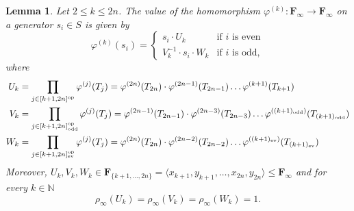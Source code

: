 \documentclass[12pt,reqno,a4paper]{article}
\newtheorem{lemma}[theorem]{Lemma}
\theoremstyle{definition}
\theoremstyle{remark}
\numberwithin{equation}{section}
\numberwithin{figure}{section}
\newcommand{\B}[1]{{\mathbf #1}}
\begin{document}
\begin{lemma}\label{L:fi(k)}
Let $2\leq k\leq 2n$. 
The value of the homomorphism $\varphi^{(k)}\colon \B F_\infty\to \B F_\infty$ on a generator $s_i\in S$ is given by
\begin{equation}
\varphi^{(k)}(s_i)=
\begin{cases}
s_i\cdot U_{k} & \text{if $i$ is even}\\
V_{k}^{-1} \cdot s_i\cdot W_{k} & \text{if $i$ is odd},
\end{cases}
\label{Eq:fi(k)}
\end{equation}
where
\begin{align*}
U_{k} 
&= 
\prod_{j \in [k+1,2n]^{\rm op}} \varphi^{(j)}(T_j) = 
\varphi^{(2n)}(T_{2n}) \cdot \varphi^{(2n-1)}(T_{2n-1}) \dots  \varphi^{(k+1)}(T_{k+1})
\\
V_{k}
&= 
\prod_{j \in [k+1,2n]_{\rm odd}^{\rm op}} \varphi^{(j)}(T_j) = 
\varphi^{(2n-1)}(T_{2n-1}) \cdot \varphi^{(2n-3)}(T_{2n-3}) \dots  \varphi^{((k+1)_{\rm odd})}(T_{(k+1)_{\rm odd}})
\\
W_{k} 
&= 
\prod_{j \in [k+1,2n]_{\rm ev}^{\rm op}} \varphi^{(j)}(T_j) = 
\varphi^{(2n)}(T_{2n}) \cdot \varphi^{(2n-2)}(T_{2n-2}) \dots  \varphi^{((k+1)_{\rm ev})}(T_{(k+1)_{\rm ev}})
\end{align*}
Moreover, $U_k,V_k,W_k\in \B F_{\{k+1,\ldots,2n\}}=\langle x_{k+1},y_{k+1},\ldots,x_{2n},y_{2n} \rangle \leq \B F_\infty$  and for every $k\in \mathbb N$ 
\[
\rho_{\infty}(U_k)=\rho_{\infty}(V_k)=\rho_{\infty}(W_k)=1.
\]

\end{lemma}
\end{document}
